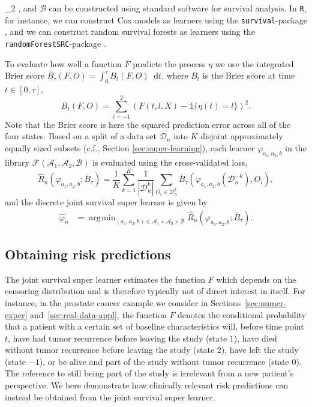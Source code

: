 \documentclass[a4paper,danish]{article}
\theoremstyle{plain} %
\numberwithin{theorem}{section}
\theoremstyle{definition} %
\theoremstyle{remark}
\renewcommand{\phi}{\varphi}
\newcommand*\diff{\mathop{}\!\mathrm{d}}
\newcommand{\1}{\mathds{1}}
\DeclareMathOperator*{\argmin}{\arg\!\min}
\newcommand{\data}{\ensuremath{\mathcal{D}}}
\begin{document}
_2 \), and \( \mathcal{B} \) can be constructed using
standard software for survival analysis. In
\texttt{R}, for instance, we can construct Cox models as
learners using the \texttt{survival}-package
\citep{survival-package}, and we can construct random survival
forests as learners using the \texttt{randomForestSRC}-package \citep{randomForestSRC}.

To evaluate how well a function \( F \) predicts the
process $\eta$ we use the integrated Brier score \citep{graf1999assessment}
\( \bar B_\tau( F,O) = \int_0^{\tau} B_t(F,O) \diff t \),
where \( B_t \) is the Brier score
\citep{brier1950verification} at time \( t \in [0, \tau] \),
\begin{equation*}
  B_t(F,O) = \sum_{l=-1}^{2}
  \left(
      F(t,l,X) - \1{\{\eta(t)=l\}}
  \right)^2.
\end{equation*}
Note that the Brier score is here the squared prediction error across
all of the four states. Based on a split of a data set \(\data_n\)
into $K$ disjoint approximately equally sized subsets (c.f., Section
\ref{sec:super-learning}), each learner \( \phi_{a_1, a_2, b} \) in
the library
\( \mathcal{F}(\mathcal{A}_1, \mathcal{A}_2, \mathcal{B}) \) is
evaluated using the cross-validated loss,
\begin{equation*}
  \hat{R}_{n}(\phi_{a_1,a_2,b} ; \bar{B}_{\tau}) =
  \frac{1}{K}\sum_{k=1}^{K}
  \frac{1}{| \data_n^{k} |}\sum_{O_i \in \data_n^{k}}
  \bar B_\tau
  {
    \left(
      \phi_{a_1,a_2,b}{ (\data_n^{-k})}
      , O_i
    \right)
  },
\end{equation*}
and the discrete joint survival super learner is given by
\begin{align*}\label{eq:discrete-state-learner}
  \hat{\phi}_n
  &=  \argmin_{(a_1,a_2,b)\in \mathcal{A}_1\times\mathcal{A}_2\times\mathcal{B}}
    \hat{R}_{n}(\phi_{a_1,a_2,b} ; \bar{B}_{\tau}).
\end{align*}




\subsection{Obtaining risk predictions}
\label{sec:use-cases-state}

The joint survival super learner estimates the function \( F \) which depends on the censoring
distribution and is therefore typically not of direct interest in
itself. For instance, in the prostate cancer example we consider in
Sections~\ref{sec:numer-exper} and~\ref{sec:real-data-appl}, the
function \( F \) denotes the conditional probability that a patient
with a certain set of baseline characteristics will, before time point
\( t \), have had tumor recurrence before leaving the study (state
$1$), have died without tumor recurrence before leaving the study
(state $2$), have left the study (state $-1$), or be alive and part of
the study without tumor recurrence (state $0$). The reference to still
being part of the study is irrelevant from a new patient's
perspective. We here demonstrate how clinically relevant risk
predictions can instead be obtained from the joint survival super learner.
\end{document}
